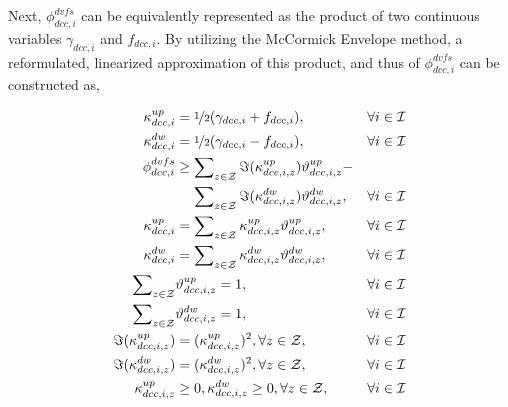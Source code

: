 \documentclass[lettersize,journal]{IEEEtran}
\begin{document}
Next, $\phi_{dcc,i}^{dvfs}$ can be equivalently represented as the product of two continuous variables $\gamma_{dcc,i}$ and $f_{dcc,i}$. By utilizing the McCormick Envelope method, a reformulated, linearized approximation of this product, and thus of $\phi_{dcc,i}^{dvfs}$ can be constructed as,

\vspace{-0.25cm}
\begin{subequations}
	\begin{align}
		\kappa_{dcc,i}^{up}             & = \nicefrac{1}{2}(\gamma_{dcc,i} + f_{dcc,i}),                                              &  & \forall i\in\mathcal{I} \\
		\kappa_{dcc,i}^{dw}             & = \nicefrac{1}{2}(\gamma_{dcc,i} - f_{dcc,i}),                                              &  & \forall i\in\mathcal{I} \\
		\phi_{dcc,i}^{dvfs}             & \geq \sum\nolimits_{z\in\mathcal{Z}} \Im(\kappa_{dcc,i,z}^{up})\vartheta_{dcc,i,z}^{up} -   &  &                         \\
		                                & \quad\, \sum\nolimits_{z\in\mathcal{Z}} \Im(\kappa_{dcc,i,z}^{dw})\vartheta_{dcc,i,z}^{dw}, &  & \forall i\in\mathcal{I} \\
		\kappa_{dcc,i}^{up}             & = \sum\nolimits_{z\in\mathcal{Z}} \kappa_{dcc,i,z}^{up}\vartheta_{dcc,i,z}^{up},            &  & \forall i\in\mathcal{I} \\
		\kappa_{dcc,i}^{dw}             & = \sum\nolimits_{z\in\mathcal{Z}} \kappa_{dcc,i,z}^{dw}\vartheta_{dcc,i,z}^{dw},            &  & \forall i\in\mathcal{I} \\
		\sum\nolimits_{z\in\mathcal{Z}} & \vartheta_{dcc,i,z}^{up} = 1,                                                               &  & \forall i\in\mathcal{I} \\
		\sum\nolimits_{z\in\mathcal{Z}} & \vartheta_{dcc,i,z}^{dw} = 1,                                                               &  & \forall i\in\mathcal{I} \\
		\Im(\kappa_{dcc,i,z}^{up})      & = (\kappa_{dcc,i,z}^{up})^2, \forall z\in\mathcal{Z},                                       &  & \forall i\in\mathcal{I} \\
		\Im(\kappa_{dcc,i,z}^{dw})      & = (\kappa_{dcc,i,z}^{dw})^2, \forall z\in\mathcal{Z},                                       &  & \forall i\in\mathcal{I} \\
		\kappa_{dcc,i,z}^{up}           & \geq 0, \kappa_{dcc,i,z}^{dw} \geq 0,\forall z\in\mathcal{Z},                               &  & \forall i\in\mathcal{I}
	\end{align}
\end{subequations}
\end{document}
